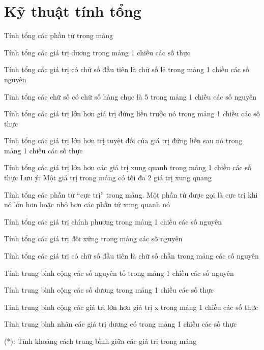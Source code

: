 \section{Kỹ thuật tính tổng}

\begin{problem}
    Tính tổng các phần tử trong mảng
\end{problem}
\begin{problem}
    Tính tổng các giá trị dương trong mảng 1 chiều các số thực
\end{problem}
\begin{problem}
    Tính tổng các giá trị có chữ số đầu tiên là chữ số lẻ trong mảng 1 chiều các số nguyên
\end{problem}
\begin{problem}
    Tinh tổng các chữ số có chữ số hàng chục là 5 trong mảng 1 chiều các số nguyên
\end{problem}
\begin{problem}
    Tính tổng các giá trị lớn hơn giá trị đứng liền trước nó trong mảng 1 chiều các số thực
\end{problem}
\begin{problem}
    Tính tổng các giá trị lớn hơn trị tuyệt đối của giá trị đứng liền sau nó trong mảng 1 chiều các số thực
\end{problem}
\begin{problem}
    Tính tổng các giá trị lớn hơn các giá trị xung quanh trong mảng 1 chiều các số thực  Lưu ý: Một giá trị trong mảng có tối đa 2 giá trị xung quang
\end{problem}
\begin{problem}
    Tính tổng các phần tử “cực trị” trong mảng. Một phần tử được gọi là cực trị khi nó lớn hơn hoặc nhỏ hơn các phần tử xung quanh nó
\end{problem}
\begin{problem}
    Tính tổng các giá trị chính phương trong mảng 1 chiều các số nguyên
\end{problem}
\begin{problem}
    Tính tổng các giá trị đối xứng trong mảng các số nguyên
\end{problem}
\begin{problem}
    Tính tổng các giá trị có chữ số đầu tiên là chữ số chẵn trong mảng các số nguyên
\end{problem}
\begin{problem}
    Tính trung bình cộng các số nguyên tố trong mảng 1 chiều các số nguyên
\end{problem}
\begin{problem}
    Tính trung bình cộng các số dương trong mảng 1 chiều các số thực
\end{problem}
\begin{problem}
    Tính trung bình cộng các giá trị lớn hơn giá trị x trong mảng 1 chiều các số thực
\end{problem}
\begin{problem}
    Tính trung bình nhân các giá trị dương có trong mảng 1 chiều các số thực
\end{problem}
\begin{problem}
    (*): Tính khoảng cách trung bình giữa các giá trị trong mảng
\end{problem}

